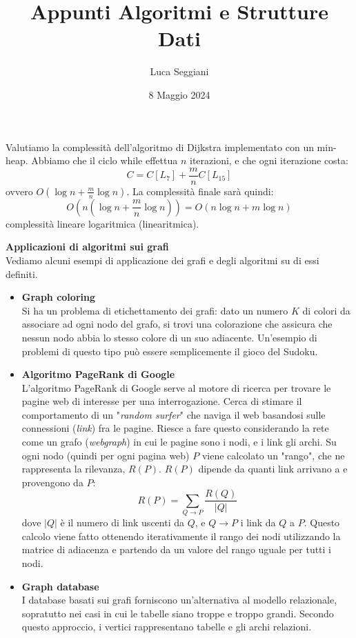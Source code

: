 \documentclass[a4paper,12pt]{article}
\title{Appunti Algoritmi e Strutture Dati}
\author{Luca Seggiani}
\date{8 Maggio 2024}
\begin{document}
\maketitle
Valutiamo la complessità dell'algoritmo di Dijkstra implementato con un min-heap. Abbiamo che il ciclo
while effettua $n$ iterazioni, e che ogni iterazione costa: $$C=C[L_7] + \frac{m}{n}C[L_{15}]$$ ovvero $O(\log{n} + \frac{m}{n}\log{n})$.
La complessità finale sarà quindi: $$O(n(\log{n} + \frac{m}{n}\log{n})) = O(n\log{n} + m\log{n})$$
complessità lineare logaritmica (linearitmica).
\par\smallskip
\textbf{Applicazioni di algoritmi sui grafi} \\
Vediamo alcuni esempi di applicazione dei grafi e degli algoritmi su di essi definiti.
\begin{itemize}
  \item \textbf{Graph coloring} \\
    Si ha un problema di etichettamento dei grafi: dato un numero $K$ di colori da associare ad ogni nodo del grafo, si trovi una colorazione che assicura
    che nessun nodo abbia lo stesso colore di un suo adiacente. Un'esempio di problemi di questo tipo può essere semplicemente il gioco del Sudoku.
  \item \textbf{Algoritmo PageRank di Google} \\
    L'algoritmo PageRank di Google serve al motore di ricerca per trovare le pagine web di interesse per una interrogazione. Cerca di stimare il comportamento
    di un "\textit{random surfer}" che naviga il web basandosi sulle connessioni (\textit{link}) fra le pagine. Riesce a fare questo considerando la rete
    come un grafo (\textit{webgraph}) in cui le pagine sono i nodi, e i link gli archi. Su ogni nodo (quindi per ogni pagina web) $P$ viene calcolato un "rango", che ne rappresenta
    la rilevanza, $R(P)$. $R(P)$ dipende da quanti link arrivano a e provengono da $P$:
    $$ R(P) = \sum_{Q\rightarrow P} \frac{R(Q)}{|Q|} $$
    dove $|Q|$ è il numero di link uscenti da $Q$, e $Q\rightarrow P$ i link da $Q$ a $P$. Questo calcolo viene fatto ottenendo iterativamente il rango dei nodi utilizzando
    la matrice di adiacenza e partendo da un valore del rango uguale per tutti i nodi.
  \item \textbf{Graph database} \\
    I database basati sui grafi forniscono un'alternativa al modello relazionale, sopratutto nei casi in cui le tabelle siano troppe e troppo grandi. Secondo
    questo approccio, i vertici rappresentano tabelle e gli archi relazioni.
\end{itemize}
\end{document}
